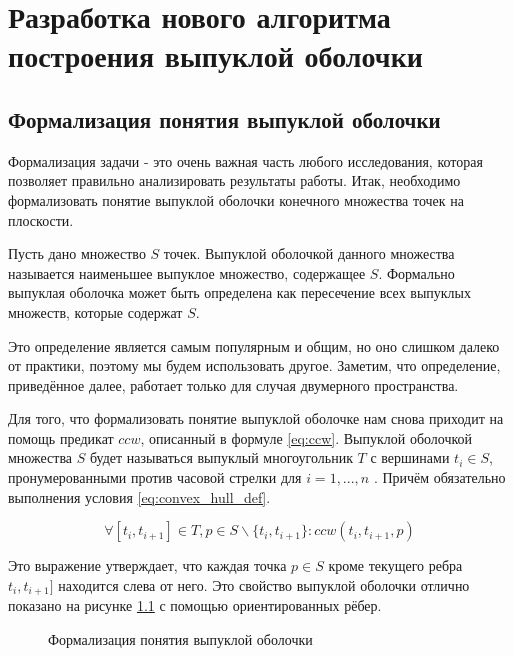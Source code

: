 \chapter{Разработка нового алгоритма построения выпуклой оболочки} \label{chapt2}

\section{Формализация понятия выпуклой оболочки} \label{sect2_1}

Формализация задачи - это очень важная часть любого исследования, которая позволяет правильно анализировать результаты работы. Итак, необходимо формализовать понятие выпуклой оболочки конечного множества точек на плоскости.

Пусть дано множество $S$ точек. Выпуклой оболочкой данного множества называется наименьшее выпуклое множество, содержащее $S$. Формально выпуклая оболочка может быть определена как пересечение всех выпуклых множеств, которые содержат $S$.

Это определение является самым популярным и общим, но оно слишком далеко от практики, поэтому мы будем использовать другое. Заметим, что определение, приведённое далее, работает только для случая двумерного пространства.

Для того, что формализовать понятие выпуклой оболочке нам снова приходит на помощь предикат $ccw$, описанный в формуле \ref{eq:ccw}. Выпуклой оболочкой множества $S$ будет называться выпуклый многоугольник $T$ с вершинами $t_i \in S$, пронумерованными против часовой стрелки для $i = 1,...,n$ \cite{pichardie2001formalizing}. Причём обязательно выполнения условия \ref{eq:convex_hull_def}.

\begin{equation}\label{eq:convex_hull_def}
\forall [t_i, t_{i+1}] \in T, p \in S \backslash \{ t_i, t_{i+1} \} : ccw(t_i, t_{i+1}, p)
\end{equation}

Это выражение утверждает, что каждая точка $p \in S$ кроме текущего ребра $t_i, t_{i+1}]$ находится слева от него. Это свойство выпуклой оболочки отлично показано на рисунке \ref{img:convex_hull_def} с помощью ориентированных рёбер.

\begin{figure}[H]
	{\centering
		\hfill
		\hfill
		\hfill
	}
	\caption{Формализация понятия выпуклой оболочки}
	\label{img:convex_hull_def}
\end{figure}

